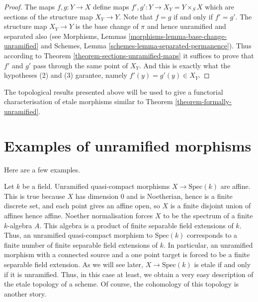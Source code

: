 \begin{proof}
The maps $f, g : Y \to X$ define maps $f', g' : Y \to X_Y = Y \times_S X$
which are sections of the structure map $X_Y \to Y$.
Note that $f = g$ if and only if $f' = g'$.
The structure map $X_Y \to Y$ is the base change of $\pi$ and hence
unramified and separated also (see
Morphisms, Lemmas \ref{morphisms-lemma-base-change-unramified} and
Schemes, Lemma \ref{schemes-lemma-separated-permanence}).
Thus according to Theorem \ref{theorem-sections-unramified-maps}
it suffices to prove that $f'$ and $g'$ pass through the same
point of $X_Y$. And this is exactly what the hypotheses (2) and (3)
garantee, namely $f'(y) = g'(y) \in X_Y$.
\end{proof}

\noindent
The topological results presented above will be used to give a functorial
characterisation of etale morphisms similar to Theorem
\ref{theorem-formally-unramified}.




\section{Examples of unramified morphisms}
\label{section-examples}

\noindent
Here are a few examples.

\begin{example}
\label{example-etale-field-extensions}
Let $k$ be a field.
Unramified quasi-compact morphisms $X \to \text{Spec}(k)$ are affine.
This is true because $X$ has dimension $0$ and is Noetherian,
hence is a finite discrete set, and each point gives an affine open,
so $X$ is a finite disjoint union of affines hence affine.
Noether normalisation forces $X$ to be the spectrum of a finite
$k$-algebra $A$.
This algebra is a product of finite separable field extensions of $k$.
Thus, an unramified quasi-compact morphism to $\text{Spec}(k)$
corresponds to a finite number of finite separable field extensions of $k$.
In particular, an unramified morphism with a connected source and a one point
target is forced to be a finite separable field extension.
As we will see later, $X \to \text{Spec}(k)$ is etale if and
only if it is unramified. Thus, in this case at least, we obtain a very easy
description of the etale topology of a scheme. Of course, the cohomology of
this topology is another story.
\end{example}

